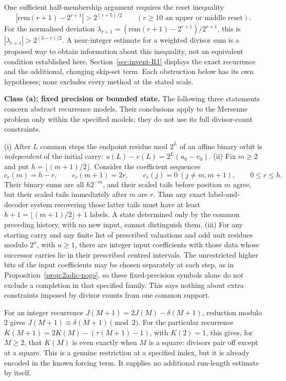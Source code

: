 One sufficient half-membership argument requires the reset inequality
\[
 |\mathrm{rem}(r+1)-2^{r+1}|>2^{(r+5)/2}
 \qquad(r\ge10\text{ an upper or middle reset}).
\]
For the normalised deviation
$\lambda_{r+1}=(\mathrm{rem}(r+1)-2^{r+1})/2^{r+1}$, this is
$|\lambda_{r+1}|>2^{(3-r)/2}$.  A near-integer estimate for a
weighted divisor sum is a proposed way to obtain information about
this inequality, not an equivalent condition established here.
Section~\ref{sec:invent-R1} displays the exact recurrence and the
additional, changing skip-set term.  Each obstruction below has its
own hypotheses; none excludes every method at the stated scale.

\textbf{Class (a): fixed precision or bounded state.} The following
three statements concern abstract recurrence models.  Their
conclusions apply to the Mersenne problem only within the specified
models; they do not use its full divisor-count constraints.

\begin{prop}
\label{prop:local-void}
(i) After $L$ common steps the endpoint residue mod $2^L$ of an affine binary orbit is
\emph{independent} of the initial carry: $u(L) - v(L) = 2^L(u_0 - v_0)$.
(ii) Fix $m\ge2$ and put $h=\lfloor(m+1)/2\rfloor$.  Consider the
coefficient sequences
\[
 c_r(m)=h-r,\qquad c_r(m+1)=2r,\qquad
 c_r(j)=0\ (j\ne m,m+1),\qquad 0\le r\le h.
\]
Their binary sums are all $h2^{-m}$, and their scaled tails before
position $m$ agree, but their scaled tails immediately after $m$ are
$r$.  Thus any exact label-and-decoder system recovering those latter
tails must have at least $h+1=\lfloor(m+1)/2\rfloor+1$ labels.  A state
determined only by the common preceding history, with no new input,
cannot distinguish them. (iii) For any
starting carry and any finite list of prescribed valuations and
odd unit residues modulo $2^u$, with $u\ge1$, there are integer input
coefficients with those data whose successor carries lie in their
prescribed centred intervals.  The unrestricted higher bits of the
input coefficients may be chosen separately at each step, as in
Proposition~\ref{prop:2adic-nogo}, so these fixed-precision symbols alone do not exclude a completion in
that specified family.  This says nothing about extra constraints imposed
by divisor counts from one common support.
\end{prop}

For an integer recurrence $J(M+1)=2J(M)-\delta(M+1)$,
reduction modulo $2$ gives $J(M+1)\equiv\delta(M+1)\pmod2$.
For the particular recurrence $K(M+1)=2K(M)-(\tau(M+1)-1)$,
with $K(2)=1$, this gives, for $M\ge2$, that $K(M)$ is even
exactly when $M$ is a square: divisors pair off except at a square.
This is a genuine restriction at a specified index, but it is already
encoded in the known forcing term.  It supplies no additional
run-length estimate by itself.

